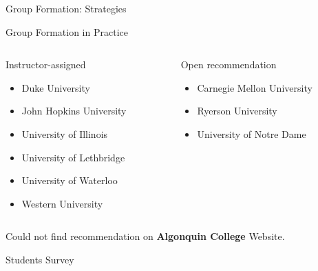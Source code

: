 \documentclass[12pt,table,aspectratio=169]{beamer}
\begin{document}
\begin{frame}{Group Formation: Strategies \cite{chapman2006, potosky2014, pociask2017, hilton2010}}
    
\end{frame}

    
    
    

\begin{frame}{Group Formation in Practice}
\begin{columns}
    \begin{column}[T]{0.5\textwidth}
        \begin{alertblock}{Instructor-assigned}
        \begin{itemize}
            \item Duke University
            \item John Hopkins University
            \item University of Illinois
            \item University of Lethbridge
            \item University of Waterloo
            \item Western University
        \end{itemize}
        \end{alertblock}
    \end{column}
    \begin{column}[T]{0.5\textwidth}
        \begin{alertblock}{Open recommendation}
        \begin{itemize}
            \item Carnegie Mellon University
            \item Ryerson University
            \item University of Notre Dame
        \end{itemize}
        \end{alertblock}
    \end{column}
\end{columns}
\vspace{1em}
{Could not find recommendation on {\textbf{Algonquin College}} Website.}
\end{frame}

\begin{frame}{Students Survey}
    
\end{frame}
\end{document}
